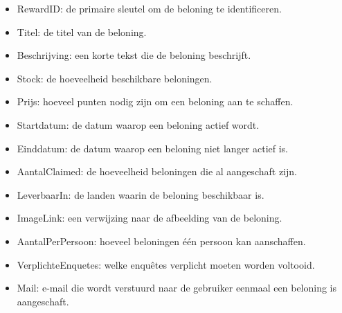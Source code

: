 \begin{itemize}
    \item RewardID: de primaire sleutel om de beloning te identificeren.
    \item Titel: de titel van de beloning.
    \item Beschrijving: een korte tekst die de beloning beschrijft.
    \item Stock: de hoeveelheid beschikbare beloningen.
    \item Prijs: hoeveel punten nodig zijn om een beloning aan te schaffen.
    \item Startdatum: de datum waarop een beloning actief wordt.
    \item Einddatum: de datum waarop een beloning niet langer actief is.
    \item AantalClaimed: de hoeveelheid beloningen die al aangeschaft zijn.
    \item LeverbaarIn: de landen waarin de beloning beschikbaar is.
    \item ImageLink: een verwijzing naar de afbeelding van de beloning.
    \item AantalPerPersoon: hoeveel beloningen één persoon kan aanschaffen.
    \item VerplichteEnquetes: welke enquêtes verplicht moeten worden voltooid.
    \item Mail: e-mail die wordt verstuurd naar de gebruiker eenmaal een beloning is aangeschaft.
\end{itemize}

